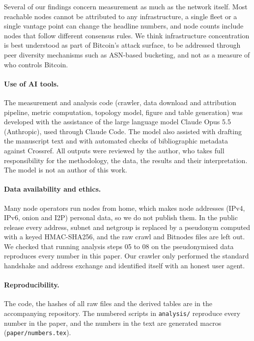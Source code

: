 \documentclass[10pt,a4paper]{article}
\begin{document}
Several of our findings concern measurement as much as the network itself. Most reachable nodes cannot be attributed to any infrastructure, a single fleet or a single vantage point can change the headline numbers, and node counts include nodes that follow different consensus rules. We think infrastructure concentration is best understood as part of Bitcoin's attack surface, to be addressed through peer diversity mechanisms such as ASN-based bucketing, and not as a measure of who controls Bitcoin.

\paragraph{Use of AI tools.} The measurement and analysis code (crawler, data download and attribution pipeline, metric computation, topology model, figure and table generation) was developed with the assistance of the large language model Claude Opus 5.5 (Anthropic), used through Claude Code. The model also assisted with drafting the manuscript text and with automated checks of bibliographic metadata against Crossref. All outputs were reviewed by the author, who takes full responsibility for the methodology, the data, the results and their interpretation. The model is not an author of this work.

\paragraph{Data availability and ethics.} Many node operators run nodes from home, which makes node addresses (IPv4, IPv6, onion and I2P) personal data, so we do not publish them. In the public release every address, subnet and netgroup is replaced by a pseudonym computed with a keyed HMAC-SHA256, and the raw crawl and Bitnodes files are left out. We checked that running analysis steps 05 to 08 on the pseudonymised data reproduces every number in this paper. Our crawler only performed the standard handshake and address exchange and identified itself with an honest user agent.

\paragraph{Reproducibility.} The code, the hashes of all raw files and the derived tables are in the accompanying repository. The numbered scripts in \texttt{analysis/} reproduce every number in the paper, and the numbers in the text are generated macros (\texttt{paper/numbers.tex}).



\end{document}
